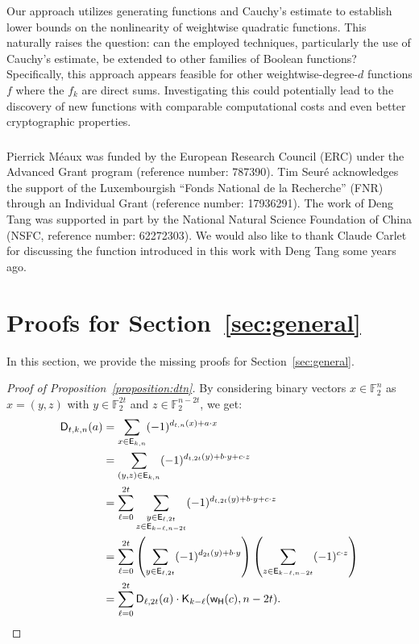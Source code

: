 \documentclass[runningheads,orivec]{llncs}
\newcommand{\Dkna}[3]{\mathsf{D}_{#2,#1}(a)}
\newcommand{\Dtkna}[4]{\mathsf{D}_{#1,#2,#3}(#4)}
\newcommand{\Ekn}[2]{\mathsf{E}_{#1,#2}}
\newcommand{\F}{\mathbb{F}}
\newcommand{\kraw}[3]{\mathsf{K}_{#1}(#2,#3)}
\newcommand{\w}{\mathsf{w_H}}
\begin{document}
    Our approach utilizes generating functions and Cauchy’s estimate to establish lower bounds on the nonlinearity of weightwise quadratic functions. This naturally raises the question: can the employed techniques, particularly the use of Cauchy’s estimate, be extended to other families of Boolean functions? Specifically, this approach appears feasible for other weightwise-degree-$d$ functions $f$ where the $f_k$ are direct sums. Investigating this could potentially lead to the discovery of new functions with comparable computational costs and even better cryptographic properties.
    
    \begin{credits}
        \subsubsection{\ackname}
    
        Pierrick Méaux was funded by the European Research Council (\textsf{ERC}) under the Advanced Grant program (reference number: 787390). Tim Seuré acknowledges the support of the Luxembourgish “Fonds National de la Recherche” (\textsf{FNR}) through an Individual Grant (reference number: 17936291). The work of Deng Tang was supported in part by the National Natural Science Foundation of China (\textsf{NSFC}, reference number: 62272303). We would also like to thank Claude Carlet for discussing the function introduced in this work with Deng Tang some years ago.
    \end{credits}
    
    \appendix
    
    \section{Proofs for Section~\ref{sec:general}}\label{sec:proofs}
    
    In this section, we provide the missing proofs for Section~\ref{sec:general}.
    
    \begin{proof}[Proof of Proposition~\ref{proposition:dtn}]
        By considering binary vectors $x\in\F_2^n$ as $x=(y,z)$ with $y\in\F_2^{2t}$ and $z\in\F_2^{n-2t}$, we get:	
    	\begin{align*}
    		\Dtkna{t}{k}{n}{a}&=\sum_{x \in \Ekn{k}{n}} (-1)^{d_{t,n}(x)+a\cdot x}\\
    		&=\sum_{(y,z)\in\Ekn{k}{n}} (-1)^{d_{t,2t}(y)+b\cdot y +c\cdot z}\\
    		&=\sum_{\ell=0}^{2t} \sum_{\substack{y \in \Ekn{\ell}{2t}\\z \in \Ekn{k-\ell}{n-2t}}} (-1)^{d_{t,2t}(y)+b\cdot y +c\cdot z}\\
    		&=\sum_{\ell=0}^{2t}\left(\sum_{y \in \Ekn{\ell}{2t}} (-1)^{d_{2t}(y)+b\cdot y}\right)\left( \sum_{z \in \Ekn{k-\ell}{n-2t}} (-1)^{c\cdot z}\right)\\&=\sum_{\ell=0}^{2t} \Dkna{2t}{\ell}{b}\cdot\kraw{k-\ell}{\w(c)}{n-2t}.\qedhere
    	\end{align*}
    \end{proof}
    
\end{document}
